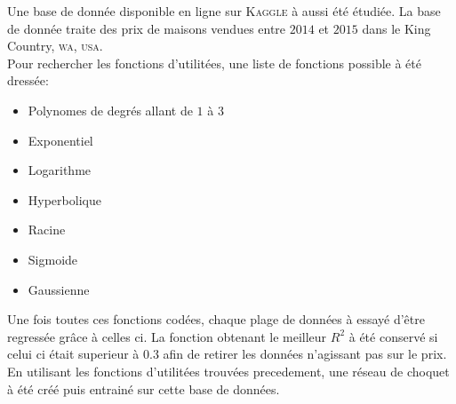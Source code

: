 Une base de donnée disponible en ligne sur \textsc{Kaggle} à aussi été étudiée\cite{kaggle}.
La base de donnée traite des prix de maisons vendues entre $2014$ et $2015$
dans le King Country, \textsc{wa}, \textsc{usa}.\\


Pour rechercher les fonctions d'utilitées, une liste de fonctions possible à été dressée:
\begin{itemize}
    \item Polynomes de degrés allant de $1$ à $3$
    \item Exponentiel
    \item Logarithme
    \item Hyperbolique
    \item Racine
    \item Sigmoide
    \item Gaussienne
\end{itemize}
Une fois toutes ces fonctions codées, chaque plage de données à essayé d'être regressée grâce à celles ci.
La fonction obtenant le meilleur $R^2$ à été conservé si celui ci était superieur à $0.3$ afin de retirer
les données n'agissant pas sur le prix.\\


En utilisant les fonctions d'utilitées trouvées precedement, une réseau de choquet à été créé puis entrainé
sur cette base de données.
